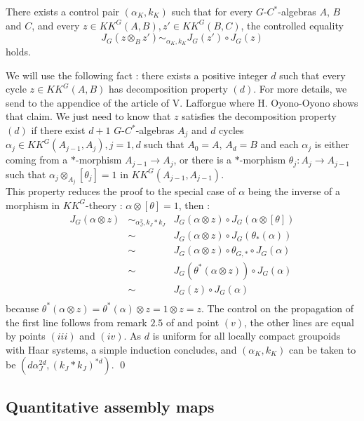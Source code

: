 \begin{prop} There exists a control pair $(\alpha_K,k_K)$ such that for every $G$-$C^*$-algebras $A$, $B$ and $C$, and every $z\in KK^G(A,B),z'\in KK^G(B,C)$, the controlled equality
\[J_G(z\otimes_B z') \sim_{\alpha_K,k_K} J_G(z')\circ J_G(z)\]
holds.
\end{prop}
\begin{dem}
We will use the following fact : there exists a positive integer $d$ such that every cycle $z\in KK^G(A,B)$ has decomposition property $(d)$. For more details, we send to the appendice of the article of V. Lafforgue \cite{LaffOY} where H. Oyono-Oyono shows that claim. We just need to know that $z$ satisfies the decomposition property $(d)$ if there exist $d+1$ $G$-$C^*$-algebras $A_j$  and $d$ cycles $\alpha_j\in KK^G(A_{j-1},A_j), j=1,d$ such that $A_0=A$, $A_d=B$ and each $\alpha_j$ is either coming from a $*$-morphism $A_{j-1}\rightarrow A_j$, or there is a $*$-morphism $\theta_j: A_j\rightarrow A_{j-1}$ such that $\alpha_j \otimes_{A_j} [\theta_j]=1$ in $KK^G(A_{j-1},A_{j-1})$.\\

This property reduces the proof to the special case of $\alpha$ being the inverse of a morphism in $KK^G$-theory : $\alpha\otimes[\theta]=1$, then :
\[\begin{array}{rcl}
J_G (\alpha\otimes z) & \sim_{\alpha_J^2,k_J*k_J} &  J_G(\alpha\otimes z)\circ J_G(\alpha\otimes [\theta]) \\
			& \sim & J_G(\alpha\otimes z)\circ J_G(\theta_*(\alpha))\\
			& \sim & J_G(\alpha\otimes z)\circ \theta_{G,*}\circ J_G(\alpha)\\
			& \sim & J_G(\theta^*(\alpha\otimes z))\circ J_G(\alpha)\\
			& \sim & J_G(z)\circ J_G(\alpha) \\
\end{array}\] 
because $\theta^*(\alpha\otimes z)=\theta^*(\alpha)\otimes z=1\otimes z =z$. The control on the propagation of the first line follows from remark $2.5$ of \cite{OY2} and point $(v)$, the other lines are equal by points $(iii)$ and $(iv)$. As $d$ is uniform for all locally compact groupoids with Haar systems, a simple induction concludes, and $(\alpha_K,k_K)$ can be taken to be $(d \alpha_J^{2d},( k_J*k_J)^{*d})$.
\qed
\end{dem}

\subsection{Quantitative assembly maps}

